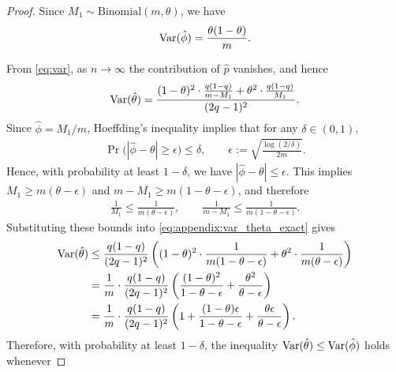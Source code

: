 \begin{proof}
    Since $M_1\sim \mathrm{Binomial}(m,\theta)$, we have
    \begin{align}
        \displaystyle \mathrm{Var}(\hat{\phi})
        =
        \frac{\theta(1-\theta)}{m}.
    \end{align}

    From \eqref{eq:var}, as $n\to\infty$ the contribution of $\hat p$ vanishes, and hence
    \begin{align}
        \displaystyle \mathrm{Var}(\hat{\theta})
        =
        \frac{
            (1-\theta)^2 \cdot \frac{q(1-q)}{m-M_1}
            + \theta^2 \cdot \frac{q(1-q)}{M_1}
        }{
            (2 q - 1)^2
        }.
        \label{eq:appendix:var_theta_exact}
    \end{align}
    Since $\hat{\phi}=M_1/m$, Hoeffding's inequality implies that for any $\delta\in(0,1)$,
    \begin{align}
        \Pr\Big( |\hat{\phi}-\theta| \geq \epsilon \Big)
        \leq \delta,
        \qquad
        \epsilon := \sqrt{\frac{\log(2/\delta)}{2m}}.
    \end{align}
    Hence, with probability at least $1-\delta$, we have $|\hat{\phi}-\theta|\le \epsilon$. This implies $M_1 \ge m(\theta-\epsilon)$ and $m-M_1 \ge m(1-\theta-\epsilon)$, and therefore
    \begin{align}
        \frac{1}{M_1}
        \leq
        \frac{1}{m(\theta-\epsilon)},
        \qquad
        \frac{1}{m-M_1}
        \leq
        \frac{1}{m(1-\theta-\epsilon)}.
    \end{align}
    Substituting these bounds into \eqref{eq:appendix:var_theta_exact} gives
    \begin{align}
        \displaystyle \mathrm{Var}(\hat{\theta})
        &\leq
        \frac{q(1-q)}{(2q-1)^2}
        \left(
            (1-\theta)^2 \cdot \frac{1}{m(1-\theta-\epsilon)}
            +\theta^2\cdot \frac{1}{m(\theta-\epsilon)}
        \right)
        \\
        &=
        \frac{1}{m}\cdot\frac{q(1-q)}{(2q-1)^2}
        \left(
            \frac{(1-\theta)^2}{1-\theta-\epsilon}
            +\frac{\theta^2}{\theta-\epsilon}
        \right)
        \\
        &=
        \frac{1}{m}\cdot\frac{q(1-q)}{(2q-1)^2}
        \left(
            1
            +
            \frac{(1-\theta)\epsilon}{1-\theta-\epsilon}
            +
            \frac{\theta\epsilon}{\theta-\epsilon}
        \right).
    \end{align}
    Therefore, with probability at least $1-\delta$, the inequality $\displaystyle \mathrm{Var}(\hat{\theta}) \le \displaystyle \mathrm{Var}(\hat{\phi})$ holds whenever

\end{proof}

